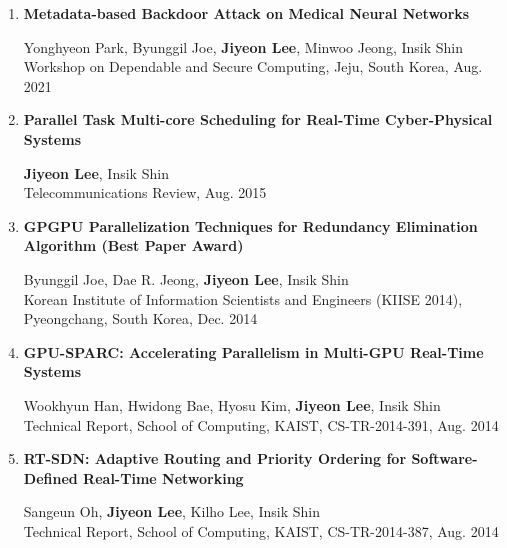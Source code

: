 \documentclass[11pt,letterpaper]{article}
\begin{document}
\begin{enumerate}

	\item \textbf{Metadata-based Backdoor Attack on Medical Neural Networks} \\
	\begin{small}
		Yonghyeon Park, Byunggil Joe, \textbf{Jiyeon Lee}, Minwoo Jeong, Insik Shin\\ 
		Workshop on Dependable and Secure Computing, Jeju, South Korea, Aug. 2021
	\end{small}

	\item \textbf{Parallel Task Multi-core Scheduling for Real-Time Cyber-Physical Systems} \\
	\begin{small}
		\textbf{Jiyeon Lee}, Insik Shin\\ 
		Telecommunications Review, Aug. 2015
	\end{small}
	
	\item \textbf{GPGPU Parallelization Techniques for Redundancy Elimination Algorithm (Best Paper Award)} \\
	\begin{small}
		Byunggil Joe, Dae R. Jeong, \textbf{Jiyeon Lee}, Insik Shin\\ 
		Korean Institute of Information Scientists and Engineers (KIISE 2014), Pyeongchang, South Korea, Dec. 2014
	\end{small}

	\item \textbf{GPU-SPARC: Accelerating Parallelism in Multi-GPU Real-Time Systems} \\
	\begin{small}
		Wookhyun Han, Hwidong Bae, Hyosu Kim, \textbf{Jiyeon Lee}, Insik Shin\\ 
		Technical Report, School of Computing, KAIST, CS-TR-2014-391, Aug. 2014
	\end{small}
	
	\item \textbf{RT-SDN: Adaptive Routing and Priority Ordering for Software-Defined Real-Time Networking} \\
	\begin{small}
		Sangeun Oh, \textbf{Jiyeon Lee}, Kilho Lee, Insik Shin\\ 
		Technical Report, School of Computing, KAIST, CS-TR-2014-387, Aug. 2014
	\end{small}
	

\end{enumerate}
\end{document}
